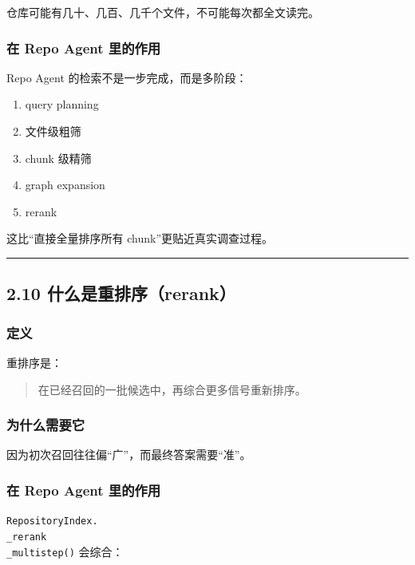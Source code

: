 \documentclass[UTF8,12pt,openany]{ctexbook}
\begin{document}
仓库可能有几十、几百、几千个文件，不可能每次都全文读完。\par

\subsubsection{在 Repo Agent 里的作用}

Repo Agent 的检索不是一步完成，而是多阶段：\par

\begin{enumerate}
\item query planning
\item 文件级粗筛
\item chunk 级精筛
\item graph expansion
\item rerank
\end{enumerate}

这比“直接全量排序所有 chunk”更贴近真实调查过程。\par

\hrule

\subsection{2.10 什么是重排序（rerank）}

\subsubsection{定义}

重排序是：\par

\begin{quote}
在已经召回的一批候选中，再综合更多信号重新排序。
\end{quote}

\subsubsection{为什么需要它}

因为初次召回往往偏“广”，而最终答案需要“准”。\par

\subsubsection{在 Repo Agent 里的作用}

\texttt{RepositoryIndex.\\_rerank\\_multistep()} 会综合：\par
\end{document}
